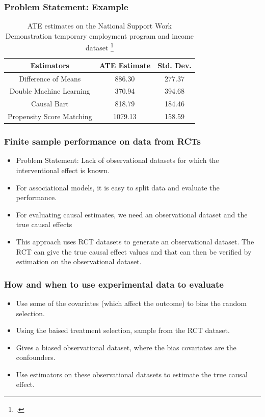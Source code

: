 \documentclass{beamer}
\begin{document}
\begin{frame}
	\frametitle{Problem Statement: Example}
	\begin{table}[h!]
		\centering
		\begin{tabularx}{\textwidth}{||c c c||} 
		 \hline
		 \textbf{Estimators}  & \textbf{ATE Estimate} & \textbf{Std. Dev.} \\
		 \hline\hline
		 Difference of Means & 886.30 & 277.37 \\ 
		 Double Machine Learning & 370.94 & 394.68 \\
		 Causal Bart & 818.79 & 184.46 \\
		 Propensity Score Matching & 1079.13 & 158.59 \\
		 \hline
		\end{tabularx}
		\caption*{ATE estimates on the National Support Work Demonstration temporary employment program and income dataset \footcite{parikh2022evaluating}}
		\label{table:estimates}
	\end{table}
\end{frame}

\begin{frame}
	\frametitle{Finite sample performance on data from RCTs}
	\begin{itemize}
		\item Problem Statement: Lack of observational datasets for which the interventional effect is known.
		\item For associational models, it is easy to split data and evaluate the performance.
		\item For evaluating causal estimates, we need an observational dataset and the true causal effects
		\item This approach uses RCT datasets to generate an observational dataset. The RCT can give the true causal effect values and that can then be verified by estimation on the observational dataset.
	\end{itemize}
\end{frame}

\begin{frame}
	\frametitle{How and when to use experimental data to evaluate}
	\begin{itemize}
		\item Use some of the covariates (which affect the outcome) to bias the random
			selection.
		\item Using the baised treatment selection, sample from the RCT dataset.
		\item Gives a biased observational dataset, where the bias covariates are the 
			confounders.
		\item Use estimators on these observational datasets to estimate the true 
			causal effect.
	\end{itemize}
\end{frame}
\end{document}
